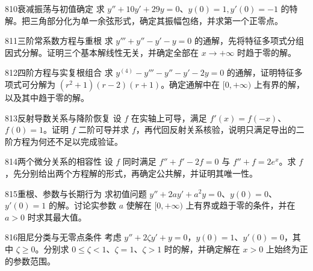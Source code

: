 \begin{exercise}{810}{衰减振荡与初值确定}
求 $y''+10y'+29y=0$、$y(0)=1,y'(0)=-1$ 的特解。把三角部分化为单一余弦形式，确定其振幅包络，并求第一个正零点。
\end{exercise}
\begin{exercise}{811}{三阶常系数方程与重根}
求 $y'''+y''-y'-y=0$ 的通解，先将特征多项式分组因式分解。证明三个基本解线性无关，并确定全部在 $x\to+\infty$ 时趋于零的解。
\end{exercise}
\begin{exercise}{812}{四阶方程与实复根组合}
求 $y^{(4)}-y'''-y''-y'-2y=0$ 的通解，证明特征多项式可分解为 $(r^2+1)(r-2)(r+1)$。确定通解中在 $[0,+\infty)$ 上有界的解，以及其中趋于零的解。
\end{exercise}
\begin{exercise}{813}{反射导数关系与降阶恢复}
设 $f$ 在实轴上可导，满足 $f'(x)=f(-x)$、$f(0)=1$。证明 $f$ 二阶可导并求 $f$，再代回反射关系核验，说明只满足导出的二阶方程为何还不足以完成验证。
\end{exercise}
\begin{exercise}{814}{两个微分关系的相容性}
设 $f$ 同时满足 $f''+f'-2f=0$ 与 $f''+f=2e^x$。求 $f$，先分别给出两个方程解的形式，再确定公共解，并证明其唯一性。
\end{exercise}
\begin{exercise}{815}{重根、参数与长期行为}
求初值问题 $y''+2ay'+a^2y=0$、$y(0)=0$、$y'(0)=1$ 的解。讨论实参数 $a$ 使解在 $[0,+\infty)$ 上有界或趋于零的条件，并在 $a>0$ 时求其最大值。
\end{exercise}
\begin{exercise}{816}{阻尼分类与无零点条件}
考虑 $y''+2\zeta y'+y=0$，$y(0)=1$、$y'(0)=0$，其中 $\zeta\ge0$。分别求 $0\le\zeta<1$、$\zeta=1$、$\zeta>1$ 时的解，并确定解在 $x>0$ 上始终为正的参数范围。
\end{exercise}
